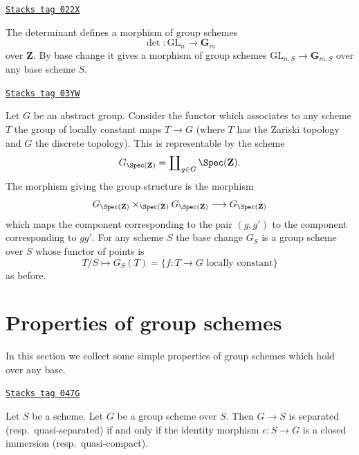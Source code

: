 \begin{example}[Determinant]
\label{groupoids-example-determinant}
\href{https://stacks.math.columbia.edu/tag/022X}{\texttt{Stacks tag 022X}}

The determinant defines a morphism of group schemes
$$
\det : \text{GL}_n \longrightarrow \mathbf{G}_m
$$
over $\mathbf{Z}$. By base change it gives a morphism
of group schemes $\text{GL}_{n, S} \to \mathbf{G}_{m, S}$
over any base scheme $S$.
\end{example}

\begin{example}

\label{groupoids-example-constant-group}
\href{https://stacks.math.columbia.edu/tag/03YW}{\texttt{Stacks tag 03YW}}

Let $G$ be an abstract group. Consider the functor
which associates to any scheme $T$ the group
of locally constant maps $T \to G$ (where $T$ has the Zariski topology
and $G$ the discrete topology). This is representable by the scheme
$$
G_{\Spec(\mathbf{Z})} =
\coprod\nolimits_{g \in G} \Spec(\mathbf{Z}).
$$
The morphism giving the group structure is the morphism
$$
G_{\Spec(\mathbf{Z})}
\times_{\Spec(\mathbf{Z})}
G_{\Spec(\mathbf{Z})}
\longrightarrow
G_{\Spec(\mathbf{Z})}
$$
which maps the component corresponding to the pair $(g, g')$ to the
component corresponding to $gg'$. For any scheme $S$ the base change
$G_S$ is a group scheme over $S$ whose functor of points is
$$
T/S
\longmapsto
G_S(T) = \{f : T \to G \text{ locally constant}\}
$$
as before.
\end{example}

\section{Properties of group schemes}
\label{groupoids-section-properties-group-schemes}
In this section we collect some simple properties of group schemes which
hold over any base.

\begin{lemma}
\label{groupoids-lemma-group-scheme-separated}
\href{https://stacks.math.columbia.edu/tag/047G}{\texttt{Stacks tag 047G}}

Let $S$ be a scheme.
Let $G$ be a group scheme over $S$.
Then $G \to S$ is separated (resp.\ quasi-separated) if and only if
the identity morphism $e : S \to G$ is a closed immersion
(resp.\ quasi-compact).
\end{lemma}

